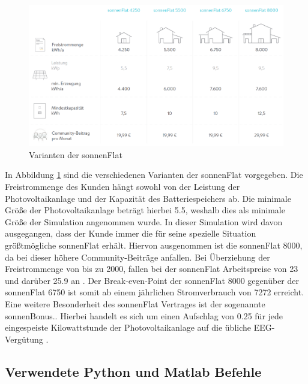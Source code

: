 \begin{figure}[H]
	\begin{center}
		\includegraphics[width=\textwidth]{Bilder/flat.png}
		\caption{Varianten der sonnenFlat \parencite[s. S. 26][]{flat20}}
		\label{fig:flat_ver}
	\end{center}
\end{figure}

\noindent In Abbildung \ref{fig:flat_ver} sind die verschiedenen Varianten der sonnenFlat vorgegeben. Die Freistrommenge des Kunden hängt sowohl von der Leistung der Photovoltaikanlage und der Kapazität des Batteriespeichers ab. Die minimale Größe der Photovoltaikanlage beträgt hierbei \SI{5.5}{\kwp}, weshalb dies als minimale Größe der Simulation angenommen wurde. In dieser Simulation wird davon ausgegangen, dass der Kunde immer die für seine spezielle Situation größtmögliche sonnenFlat erhält. Hiervon ausgenommen ist die sonnenFlat 8000, da bei dieser höhere Community-Beiträge anfallen. Bei Überziehung der Freistrommenge von bis zu \SI{2000}{\kwh}, fallen bei der sonnenFlat Arbeitspreise von \SI{23}{\ctkwh} und darüber \SI{25.9}{\ctkwh} an \parencite{flat20}. Der Break-even-Point der sonnenFlat 8000 gegenüber der sonnenFlat 6750 ist somit ab einem jährlichen Stromverbrauch von \SI{7272}{\kwh} erreicht.\medskip\\
Eine weitere Besonderheit des sonnenFlat Vertrages ist der sogenannte sonnenBonus.. Hierbei handelt es sich um einen Aufschlag von  \SI{0.25}{\ctkwh} für jede eingespeiste Kilowattstunde der Photovoltaikanlage auf die übliche EEG-Vergütung \parencite{sonnenBonus20}.

\subsection{Verwendete Python und Matlab Befehle}

